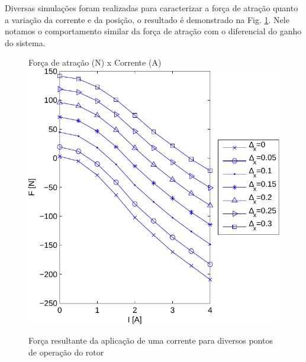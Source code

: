 Diversas simulações foram realizadas para caracterizar a força de atração quanto a variação da corrente e da posição, o resultado é demonstrado na Fig. \ref{ativo_otimizado_fem_I_dx_map}. Nele notamos o comportamento similar da força de atração com o diferencial do ganho do sistema.

\begin{figure}[ht!]
\centering
Força de atração (N) x Corrente (A)
\includegraphics[width=0.7\linewidth]{Figs/Simulacoes/Ativo/ativo_otimizado_fem_I_dx_map.pdf}
\caption{Força resultante da aplicação de uma corrente  para diversos pontos de operação do rotor}
\label{ativo_otimizado_fem_I_dx_map}
\end{figure}


